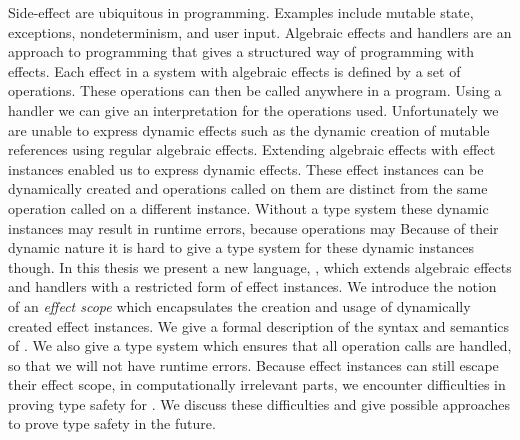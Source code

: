 Side-effect are ubiquitous in programming. Examples include mutable state, exceptions, nondeterminism, and user input.
Algebraic effects and handlers are an approach to programming that gives a structured way of programming with effects.
Each effect in a system with algebraic effects is defined by a set of operations.
These operations can then be called anywhere in a program.
Using a handler we can give an interpretation for the operations used.
Unfortunately we are unable to express dynamic effects such as the dynamic creation of mutable references using regular algebraic effects.
Extending algebraic effects with effect instances enabled us to express dynamic effects.
These effect instances can be dynamically created and operations called on them are distinct from the same operation called on a different instance.
Without a type system these dynamic instances may result in runtime errors, because operations may
Because of their dynamic nature it is hard to give a type system for these dynamic instances though.
In this thesis we present a new language, \lang{}, which extends algebraic effects and handlers with a restricted form of effect instances.
We introduce the notion of an \emph{effect scope} which encapsulates the creation and usage of dynamically created effect instances. We give a formal description of the syntax and semantics of \lang{}.
We also give a type system which ensures that all operation calls are handled, so that we will not have runtime errors.
Because effect instances can still escape their effect scope, in computationally irrelevant parts, we encounter difficulties in proving type safety for \lang{}. We discuss these difficulties and give possible approaches to prove type safety in the future.
